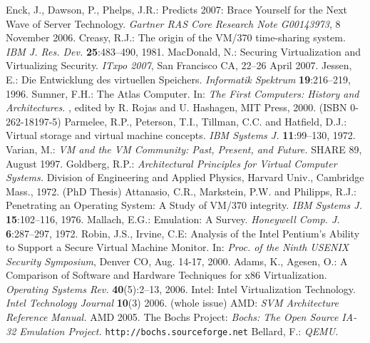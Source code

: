 \documentclass[11pt,a4paper]{llncs}
\begin{document}
\begin{thebibliography}{99}
{\sc Enck, J., Dawson, P., Phelps, J.R.:} 
{\rm Predicts 2007: Brace Yourself for the Next Wave of Server Technology.}
{\em Gartner RAS Core Research Note G00143973}, 8 November 2006.
{\sc Creasy, R.J.:}
{\rm The origin of the VM/370 time-sharing system. }
{\em IBM J. Res. Dev.} {\bfseries 25}:483--490, 1981.
{\sc MacDonald, N.:}
{\rm Securing Virtualization and Virtualizing Security. }
{\em ITxpo 2007}, San Francisco CA, 22--26 April 2007.
{\sc Jessen, E.:}
{\rm Die Entwicklung des virtuellen Speichers. }
{\em Informatik Spektrum} {\bfseries 19}:216--219, 1996.
{\sc Sumner, F.H.:}
{\rm The Atlas Computer. }
In:
{\em The First Computers: History and Architectures. },
edited by R. Rojas and U. Hashagen, MIT Press, 2000.
(ISBN 0-262-18197-5)
{\sc Parmelee, R.P., Peterson, T.I., Tillman, C.C. and Hatfield, D.J.:}
{\rm Virtual storage and virtual machine concepts. }
{\em IBM Systems J.} {\bfseries 11}:99--130, 1972.
{\sc Varian, M.:}
{\em VM and the VM Community: Past, Present, and Future. }
SHARE 89, August 1997.
{\sc Goldberg, R.P.:}
{\em Architectural Principles for Virtual Computer Systems.}
Division of Engineering and Applied Physics, Harvard Univ.,
Cambridge Mass., 1972. (PhD Thesis)
{\sc Attanasio, C.R., Markstein, P.W. and Philipps, R.J.:}
{\rm Penetrating an Operating System: A Study of VM/370 integrity. }
{\em IBM Systems J.} {\bfseries 15}:102--116, 1976.
{\sc Mallach, E.G.:}
{\rm Emulation: A Survey. }
{\em Honeywell Comp. J.} {\bfseries 6}:287--297, 1972.
{\sc Robin, J.S., Irvine, C.E:}
{\rm Analysis of the Intel Pentium's Ability to Support a Secure Virtual
Machine Monitor.}
In: {\em Proc. of the Ninth USENIX Security Symposium}, Denver CO, Aug. 14-17, 
2000.
{\sc Adams, K., Agesen, O.:}
{\rm A Comparison of Software and Hardware Techniques for x86 Virtualization. }
{\em Operating Systems Rev.} {\bfseries 40}(5):2--13, 2006.
{\sc Intel:}
{\rm Intel Virtualization Technology. }
{\em Intel Technology Journal} {\bfseries 10}(3) 2006. (whole issue)
{\sc AMD:}
{\em SVM Architecture Reference Manual. }
AMD 2005.
{\sc The Bochs Project:}
{\em Bochs: The Open Source IA-32 Emulation Project. }
{\tt http://bochs.sourceforge.net}
{\sc Bellard, F.:}
{\em QEMU.}

\end{thebibliography}
\end{document}
